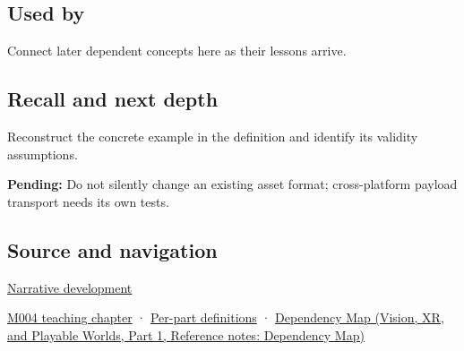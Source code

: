 \subsection{Used by}\label{appendix-e90053a4b201-used-by}

\hypertarget{appendix-e90053a4b201-used-by}{}

Connect later dependent concepts here as their lessons arrive.

\subsection{Recall and next depth}\label{appendix-e90053a4b201-recall-and-next-depth}

\hypertarget{appendix-e90053a4b201-recall-and-next-depth}{}

Reconstruct the concrete example in the definition and identify its validity assumptions.

\textbf{Pending:} Do not silently change an existing asset format; cross-platform payload transport needs its own tests.

\subsection{Source and navigation}\label{appendix-e90053a4b201-source-and-navigation}

\hypertarget{appendix-e90053a4b201-source-and-navigation}{}

\hyperref[01-foundations-i-ch001-choosing-what-information-to-keep]{Narrative development}

\hyperref[01-foundations-i-ch001-a-stretching-ruler-for-real-valued-quantities]{M004 teaching chapter} · \hyperref[appendix-fd090d982a15-m004---parts-61-76]{Per-part definitions} · \href{../07-Vision-XR-and-Playable-Worlds-P01/main.pdf\#appendix-4ad47bdd269a}{Dependency Map (Vision, XR, and Playable Worlds, Part 1, Reference notes: Dependency Map)}
